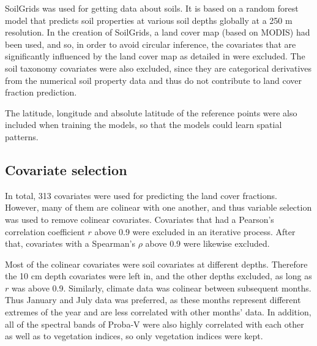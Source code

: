 \documentclass[review,authoryear,3p]{elsarticle}
\begin{document}

SoilGrids \citep{hengl_soilgrids250m_2017} was used for getting data about soils.
It is based on a random forest model that predicts soil properties at various soil depths globally at a 250 m resolution.
In the creation of SoilGrids, a land cover map (based on MODIS) had been used, and so, in order to avoid circular inference, the covariates that are significantly influenced by the land cover map as detailed in \citet{hengl_soilgrids250m_2017} were excluded.
The soil taxonomy covariates were also excluded, since they are categorical derivatives from the numerical soil property data and thus do not contribute to land cover fraction prediction.


The latitude, longitude and absolute latitude of the reference points were also included when training the models, so that the models could learn spatial patterns.

\subsection{Covariate selection}
\label{sec-covariate-selection}

In total, 313 covariates were used for predicting the land cover fractions.
However, many of them are colinear with one another, and thus variable selection was used to remove colinear covariates.
Covariates that had a Pearson's correlation coefficient $r$ above 0.9 were excluded in an iterative process.
After that, covariates with a Spearman's $\rho$ above 0.9 were likewise excluded.

Most of the colinear covariates were soil covariates at different depths.
Therefore the 10 cm depth covariates were left in, and the other depths excluded, as long as $r$ was above 0.9.
Similarly, climate data was colinear between subsequent months. Thus January and July data was preferred, as these months represent different extremes of the year and are less correlated with other months' data.
In addition, all of the spectral bands of Proba-V were also highly correlated with each other as well as to vegetation indices, so only vegetation indices were kept.
\end{document}
